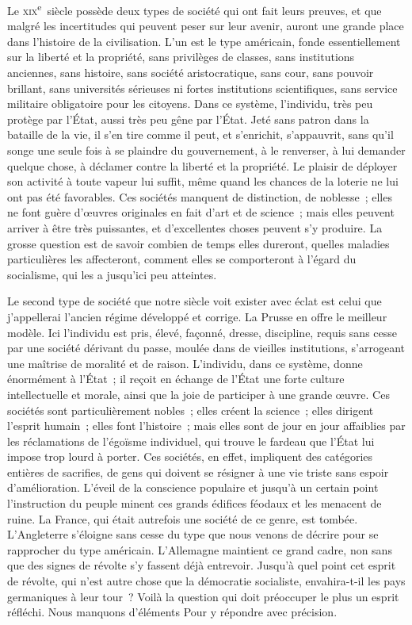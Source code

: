 \documentclass[french,twoside]{book} %
\begin{document}
Le \textsc{xix}\textsuperscript{e} siècle possède deux types de société qui ont fait leurs preuves, et que malgré les incertitudes qui peuvent peser sur leur avenir, auront une grande place dans l’histoire de la civilisation. L’un est le type américain, fonde essentiellement sur la liberté et la propriété, sans privilèges de classes, sans institutions anciennes, sans histoire, sans société aristocratique, sans cour, sans pouvoir brillant, sans universités sérieuses ni fortes institutions scientifiques, sans service militaire obligatoire pour les citoyens. Dans ce système, l’individu, très peu protège par l’État, aussi très peu gêne par l’État. Jeté sans patron dans la bataille de la vie, il s’en tire comme il peut, et s’enrichit, s’appauvrit, sans qu’il songe une seule fois à se plaindre du gouvernement, à le renverser, à lui demander quelque chose, à déclamer contre la liberté et la propriété. Le plaisir de déployer son activité à toute vapeur lui suffit, même quand les chances de la loterie ne lui ont pas été favorables. Ces sociétés manquent de distinction, de noblesse ; elles ne font guère d’œuvres originales en fait d’art et de science ; mais elles peuvent arriver à être très puissantes, et d’excellentes choses peuvent s’y produire. La grosse question est de savoir combien de temps elles dureront, quelles maladies particulières les affecteront, comment elles se comporteront à l’égard du socialisme, qui les a jusqu’ici peu atteintes.\par
Le second type de société que notre siècle voit exister avec éclat est celui que j’appellerai l’ancien régime développé et corrige. La Prusse en offre le meilleur modèle. Ici l’individu est pris, élevé, façonné, dresse, discipline, requis sans cesse par une société dérivant du passe, moulée dans de vieilles institutions, s’arrogeant une maîtrise de moralité et de raison. L’individu, dans ce système, donne énormément à l’État ; il reçoit en échange de l’État une forte culture intellectuelle et morale, ainsi que la joie de participer à une grande œuvre. Ces sociétés sont particulièrement nobles ; elles créent la science ; elles dirigent l’esprit humain ; elles font l’histoire ; mais elles sont de jour en jour affaiblies par les réclamations de l’égoïsme individuel, qui trouve le fardeau que l’État lui impose trop lourd à porter. Ces sociétés, en effet, impliquent des catégories entières de sacrifies, de gens qui doivent se résigner à une vie triste sans espoir d’amélioration. L’éveil de la conscience populaire et jusqu’à un certain point l’instruction du peuple minent ces grands édifices féodaux et les menacent de ruine. La France, qui était autrefois une société de ce genre, est tombée. L’Angleterre s’éloigne sans cesse du type que nous venons de décrire pour se rapprocher du type américain. L’Allemagne maintient ce grand cadre, non sans que des signes de révolte s’y fassent déjà entrevoir. Jusqu’à quel point cet esprit de révolte, qui n’est autre chose que la démocratie socialiste, envahira-t-il les pays germaniques à leur tour ? Voilà la question qui doit préoccuper le plus un esprit réfléchi. Nous manquons d’éléments Pour y répondre avec précision.\par
\end{document}
